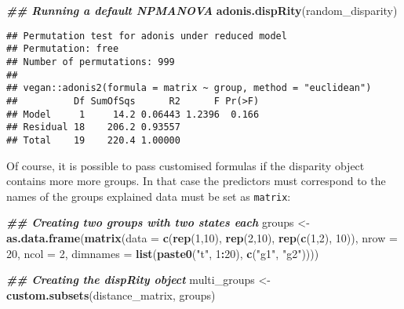 \documentclass[
]{book}
\newenvironment{Shaded}{\begin{snugshade}}{\end{snugshade}}
\newcommand{\AttributeTok}[1]{\textcolor[rgb]{0.13,0.29,0.53}{#1}}
\newcommand{\DecValTok}[1]{\textcolor[rgb]{0.00,0.00,0.81}{#1}}
\newcommand{\DocumentationTok}[1]{\textcolor[rgb]{0.56,0.35,0.01}{\textbf{\textit{#1}}}}
\newcommand{\FunctionTok}[1]{\textcolor[rgb]{0.13,0.29,0.53}{\textbf{#1}}}
\newcommand{\NormalTok}[1]{#1}
\newcommand{\OtherTok}[1]{\textcolor[rgb]{0.56,0.35,0.01}{#1}}
\newcommand{\SpecialCharTok}[1]{\textcolor[rgb]{0.81,0.36,0.00}{\textbf{#1}}}
\newcommand{\StringTok}[1]{\textcolor[rgb]{0.31,0.60,0.02}{#1}}
\begin{document}
\begin{Shaded}
\begin{Highlighting}[]
\DocumentationTok{\#\# Running a default NPMANOVA}
\FunctionTok{adonis.dispRity}\NormalTok{(random\_disparity)}
\end{Highlighting}
\end{Shaded}

\begin{verbatim}
## Permutation test for adonis under reduced model
## Permutation: free
## Number of permutations: 999
## 
## vegan::adonis2(formula = matrix ~ group, method = "euclidean")
##          Df SumOfSqs      R2      F Pr(>F)
## Model     1     14.2 0.06443 1.2396  0.166
## Residual 18    206.2 0.93557              
## Total    19    220.4 1.00000
\end{verbatim}

Of course, it is possible to pass customised formulas if the disparity object contains more more groups.
In that case the predictors must correspond to the names of the groups explained data must be set as \texttt{matrix}:

\begin{Shaded}
\begin{Highlighting}[]
\DocumentationTok{\#\# Creating two groups with two states each}
\NormalTok{groups }\OtherTok{\textless{}{-}} \FunctionTok{as.data.frame}\NormalTok{(}\FunctionTok{matrix}\NormalTok{(}\AttributeTok{data =} \FunctionTok{c}\NormalTok{(}\FunctionTok{rep}\NormalTok{(}\DecValTok{1}\NormalTok{,}\DecValTok{10}\NormalTok{),}
                                        \FunctionTok{rep}\NormalTok{(}\DecValTok{2}\NormalTok{,}\DecValTok{10}\NormalTok{),}
                                        \FunctionTok{rep}\NormalTok{(}\FunctionTok{c}\NormalTok{(}\DecValTok{1}\NormalTok{,}\DecValTok{2}\NormalTok{), }\DecValTok{10}\NormalTok{)),}
                        \AttributeTok{nrow =} \DecValTok{20}\NormalTok{, }\AttributeTok{ncol =} \DecValTok{2}\NormalTok{,}
                        \AttributeTok{dimnames =} \FunctionTok{list}\NormalTok{(}\FunctionTok{paste0}\NormalTok{(}\StringTok{"t"}\NormalTok{, }\DecValTok{1}\SpecialCharTok{:}\DecValTok{20}\NormalTok{),}
                                        \FunctionTok{c}\NormalTok{(}\StringTok{"g1"}\NormalTok{, }\StringTok{"g2"}\NormalTok{))))}

\DocumentationTok{\#\# Creating the dispRity object}
\NormalTok{multi\_groups }\OtherTok{\textless{}{-}} \FunctionTok{custom.subsets}\NormalTok{(distance\_matrix, groups)}
\end{Highlighting}
\end{Shaded}
\end{document}
